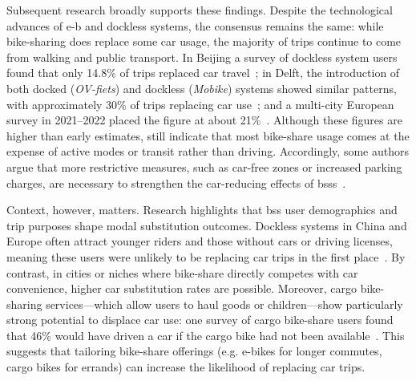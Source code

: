     Subsequent research broadly supports these findings. Despite the technological advances of \ac{e-b} and dockless systems, the consensus remains the same: while bike-sharing does replace some car usage, the majority of trips continue to come from walking and public transport. In Beijing a survey of dockless system users found that only 14.8\% of trips replaced car travel~\cite{Chen2022b}; in Delft, the introduction of both docked (\textit{OV-fiets}) and dockless (\textit{Mobike}) systems showed similar patterns, with approximately 30\% of trips replacing car use~\cite{Ma2020}; and a multi-city European survey in 2021--2022 placed the figure at about 21\%~\cite{Bosehans2024}. Although these figures are higher than early estimates, still indicate that most bike-share usage comes at the expense of active modes or transit rather than driving. Accordingly, some authors argue that more restrictive measures, such as car-free zones or increased parking charges, are necessary to strengthen the car-reducing effects of \acp{bss}~\cite{Bosehans2024}.    

    Context, however, matters. Research highlights that \ac{bss} user demographics and trip purposes shape modal substitution outcomes. Dockless systems in China and Europe often attract younger riders and those without cars or driving licenses, meaning these users were unlikely to be replacing car trips in the first place~\cite{Ma2020, Bosehans2024}. By contrast, in cities or niches where bike-share directly competes with car convenience, higher car substitution rates are possible. Moreover, cargo bike-sharing services---which allow users to haul goods or children---show particularly strong potential to displace car use: one survey of cargo bike-share users found that 46\% would have driven a car if the cargo bike had not been available~\cite{Becker2018}. This suggests that tailoring bike-share offerings (e.g. e-bikes for longer commutes, cargo bikes for errands) can increase the likelihood of replacing car trips.

